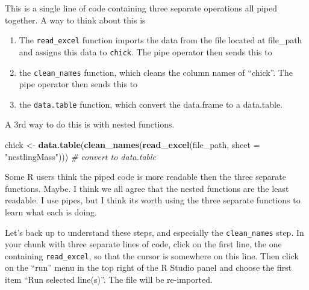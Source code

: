 \documentclass[]{book}
\newenvironment{Shaded}{\begin{snugshade}}{\end{snugshade}}
\newcommand{\CommentTok}[1]{\textcolor[rgb]{0.56,0.35,0.01}{\textit{#1}}}
\newcommand{\DataTypeTok}[1]{\textcolor[rgb]{0.13,0.29,0.53}{#1}}
\newcommand{\KeywordTok}[1]{\textcolor[rgb]{0.13,0.29,0.53}{\textbf{#1}}}
\newcommand{\NormalTok}[1]{#1}
\newcommand{\OperatorTok}[1]{\textcolor[rgb]{0.81,0.36,0.00}{\textbf{#1}}}
\newcommand{\StringTok}[1]{\textcolor[rgb]{0.31,0.60,0.02}{#1}}
\providecommand{\tightlist}{%
  \setlength{\itemsep}{0pt}\setlength{\parskip}{0pt}}
\begin{document}
\begin{Shaded}
\end{Shaded}

This is a single line of code containing three separate operations all piped together. A way to think about this is

\begin{enumerate}
\def\labelenumi{\arabic{enumi}.}
\tightlist
\item
  The \texttt{read\_excel} function imports the data from the file located at file\_path and assigns this data to \texttt{chick}. The pipe operator then sends this to
\item
  the \texttt{clean\_names} function, which cleans the column names of ``chick''. The pipe operator then sends this to
\item
  the \texttt{data.table} function, which convert the data.frame to a data.table.
\end{enumerate}

A 3rd way to do this is with nested functions.

\begin{Shaded}
\begin{Highlighting}[]
\NormalTok{chick <-}\StringTok{ }\KeywordTok{data.table}\NormalTok{(}\KeywordTok{clean_names}\NormalTok{(}\KeywordTok{read_excel}\NormalTok{(file_path, }
                    \DataTypeTok{sheet =} \StringTok{"nestlingMass"}\NormalTok{))) }\CommentTok{# convert to data.table}
\end{Highlighting}
\end{Shaded}

Some R users think the piped code is more readable then the three separate functions. Maybe. I think we all agree that the nested functions are the least readable. I use pipes, but I think its worth using the three separate functions to learn what each is doing.

Let's back up to understand these steps, and especially the \texttt{clean\_names} step. In your chunk with three separate lines of code, click on the first line, the one containing \texttt{read\_excel}, so that the cursor is somewhere on this line. Then click on the ``run'' menu in the top right of the R Studio panel and choose the first item ``Run selected line(s)''. The file will be re-imported.
\end{document}
